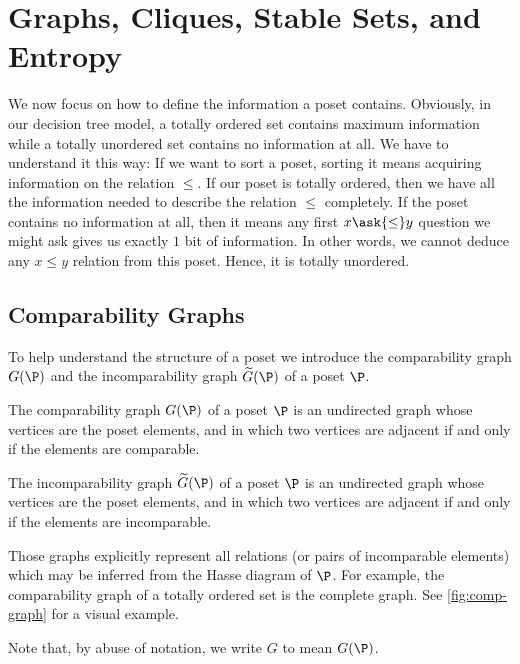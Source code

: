 \section{Graphs, Cliques, Stable Sets, and Entropy}
\label{tree:poset:graph}

We now focus on how to define the information a poset contains. Obviously, in
our decision tree model, a totally ordered set contains maximum information
while a totally unordered set contains no information at all. We have to
understand it this way: If we want to sort a poset, sorting it means acquiring
information on the relation $\le$. If our poset is totally ordered, then we
have all the information needed to describe the relation $\le$ completely. If
the poset contains no information at all, then it means any first $x \ask{\le}
y$ question we might ask gives us exactly $1$ bit of information. In other
words, we cannot deduce any $x \le y$ relation from this poset. Hence, it is
totally unordered.

\subsection{Comparability Graphs}

To help understand the structure of a poset we introduce the comparability
graph ${G}(\P)$ and the incomparability graph $\widetilde{G}(\P)$ of a poset
\(\P\).
\begin{definition}
The comparability graph ${G}(\P)$ of a poset $\P$ is an undirected graph whose
vertices are the poset elements, and in which two vertices are adjacent if and
only if the elements are comparable.
\end{definition}
\begin{definition}
The incomparability graph $\widetilde{G}(\P)$ of a poset $\P$ is an undirected
graph whose vertices are the poset elements, and in which two vertices are
adjacent if and only if the elements are incomparable.
\end{definition}

Those graphs explicitly represent all relations (or pairs of incomparable
elements) which may be inferred from the Hasse diagram of $\P$. For example,
the comparability graph of a totally ordered set is the complete graph. See
\ref{fig:comp-graph} for a visual example.

Note that, by abuse of notation, we write $G$ to mean ${G}(\P)$.


